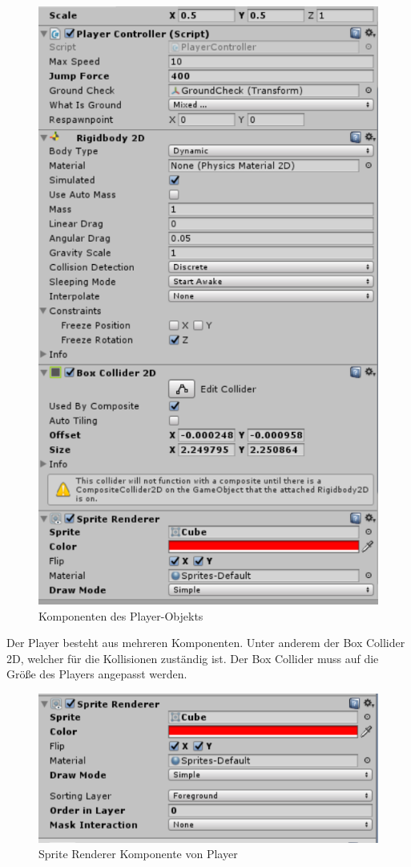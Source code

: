 \begin{figure}[H]
	\includegraphics{images/Player.png}
	\caption{Komponenten des Player-Objekts}
\end{figure}
Der Player besteht aus mehreren Komponenten. Unter anderem der Box Collider 2D, welcher für die Kollisionen zuständig ist. Der Box Collider muss auf die Größe des Players angepasst werden. 
\begin{figure}[H]
	\includegraphics[width=15cm]{images/SpriteRenderer.png}
	\caption{Sprite Renderer Komponente von Player}
\end{figure}
